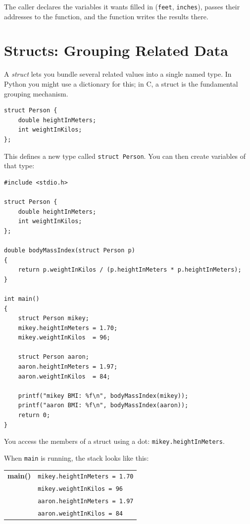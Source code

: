 The caller declares the variables it wants filled in (\texttt{feet},
\texttt{inches}), passes their addresses to the function, and the
function writes the results there.

\section{Structs: Grouping Related Data}

A \emph{struct} lets you bundle several related values into a single
named type.  In Python you might use a dictionary for this; in C, a
struct is the fundamental grouping mechanism.

\begin{verbatim}
struct Person {
    double heightInMeters;
    int weightInKilos;
};
\end{verbatim}

This defines a new type called \texttt{struct Person}.  You can then
create variables of that type:

\begin{verbatim}
#include <stdio.h>

struct Person {
    double heightInMeters;
    int weightInKilos;
};

double bodyMassIndex(struct Person p)
{
    return p.weightInKilos / (p.heightInMeters * p.heightInMeters);
}

int main()
{
    struct Person mikey;
    mikey.heightInMeters = 1.70;
    mikey.weightInKilos  = 96;

    struct Person aaron;
    aaron.heightInMeters = 1.97;
    aaron.weightInKilos  = 84;

    printf("mikey BMI: %f\n", bodyMassIndex(mikey));
    printf("aaron BMI: %f\n", bodyMassIndex(aaron));
    return 0;
}
\end{verbatim}

You access the members of a struct using a dot: \texttt{mikey.heightInMeters}.

When \texttt{main} is running, the stack looks like this:

\begin{center}
\begin{tabular}{r|l|}
\hline
\textbf{main()} & \texttt{mikey.heightInMeters = 1.70} \\
                & \texttt{mikey.weightInKilos = 96} \\
                & \texttt{aaron.heightInMeters = 1.97} \\
                & \texttt{aaron.weightInKilos = 84} \\
\hline
\end{tabular}
\end{center}

